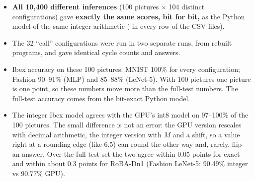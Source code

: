 \begin{itemize}
  \item \textbf{All 10{,}400 different inferences} (100 pictures $\times$ 104 distinct configurations) gave
        \textbf{exactly the same scores, bit for bit,} as the Python model of the same integer arithmetic
        ( in every row of the CSV files).
  \item The 32 ``call'' configurations were run in two separate runs, from rebuilt programs, and gave
        identical cycle counts and answers.
  \item Ibex accuracy on these 100 pictures: MNIST 100\% for every configuration; Fashion 90--91\% (MLP)
        and 85--88\% (LeNet-5). With 100 pictures one picture is one point, so these numbers move more than
        the full-test numbers. The full-test accuracy comes from the bit-exact Python model.
  \item The integer Ibex model agrees with the GPU's int8 model on 97--100\% of the 100 pictures. The small
        difference is not an error: the GPU version rescales with decimal arithmetic, the integer version with
        $M$ and a shift, so a value right at a rounding edge (like 6.5) can round the other way and, rarely,
        flip an answer. Over the full test set the two agree within 0.05 points for exact and within about
        0.3 points for RoBA-Dn1 (Fashion LeNet-5: 90.49\% integer vs 90.77\% GPU).
\end{itemize}
\newpage
